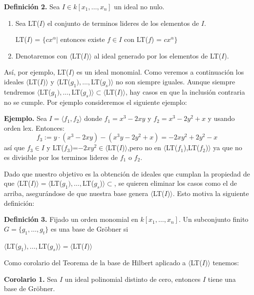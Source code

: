 \textbf{Definición 2.} Sea $I \in k[x_{1},\dots,x_{n}]$ un ideal no nulo.
\begin{enumerate}
	\item Sea LT($I$) el conjunto de terminos lideres de los elementos de $I$.
	\begin{center}
		LT($I$) = $\lbrace cx^{\alpha} |$ entonces existe $f\in I$ con LT($f$) = $cx^{\alpha}\rbrace$ 
	\end{center}
	\item Denotaremos con $\langle$LT($I$)$\rangle $ al ideal generado por los elementos de LT($I$).
\end{enumerate}


Así, por ejemplo, LT($I$) es un ideal monomial. Como veremos a continuación los ideales $\langle$LT($I$)$\rangle $ y $\langle$LT($g_{1}),\dots,$LT($g_{s}$)$\rangle$ no son siempre iguales. Aunque siempre tendremos $\langle$LT($g_{1}),\dots,$LT($g_{s}$)$\rangle \subset \langle$LT($I$)$\rangle$, hay casos en que la inclusión contraria no se cumple. Por ejemplo consideremos el siguiente ejemplo:

\textbf{Ejemplo.} Sea $I = \langle f_{1},f_{2}\rangle$ donde $f_{1}= x^{3}-2xy$ y $f_{2}= x^{3} - 2y^{2} +x $ y usando orden lex. Entonces:
\[
f_{3}:=y\cdotp(x^{3}-2xy)-(x^{3}y-2 y^{2}+x)=-2xy^{2}+2y^{2}-x
\] 
así que $f_{3}\in I$ y LT($f_{3}$)=$-2xy^{2}\in\langle$LT($I$)$\rangle $,pero no en $\langle$LT($f_{1}$),LT($f_{2}$)$\rangle$ ya que no es divisible por los terminos lideres de $f_{1}$ o $f_{2}$. 

Dado que nuestro objetivo es la obtención de ideales que cumplan la propiedad de que $\langle$LT($I$)$\rangle = \langle$LT($g_{1}),\dots,$LT($g_{s}$)$\rangle \subset $, se quieren eliminar los casos como el de arriba, asegurándose de que nuestra base genera $\langle$LT($I$)$\rangle$. Esto motiva la siguiente definición:

\textbf{Definición 3.} Fijado un orden monomial en $k[x_{1},\dots, x_{n}]$. Un subconjunto finito $G = \lbrace g_{1},\dots, g_{t}\rbrace$ es una base de Gröbner si
\begin{center}
$\langle$LT($g_{1}),\dots,$LT($g_{s}$)$\rangle = \langle$LT($I$)$\rangle$
\end{center}

Como corolario del Teorema de la base de Hilbert aplicado a $\langle$LT($I$)$\rangle$ tenemos:

\textbf{Corolario 1.} Sea $I$ un ideal polinomial distinto de cero, entonces $I$ tiene una base de Gröbner.

